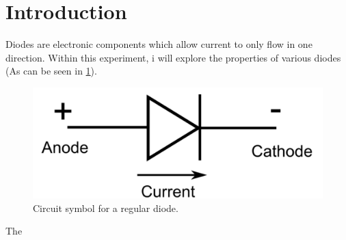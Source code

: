 \documentclass[12pt]{article}
\begin{document}

\newpage
\begin{titlepage}
\begin{tableofcontents}

\end{tableofcontents}
\end{titlepage}


\section{Introduction}

Diodes are electronic components which allow current to only flow in one direction. Within this experiment, i will explore the properties of various diodes (As can be seen in \cref{SymbolRegDiode}). 

\begin{figure}[h]
\centering
\includegraphics[scale=0.4]{Circuit_symbol_for_a_regular_diode.png}
\caption{Circuit symbol for a regular diode.}
\label{SymbolRegDiode}
\end{figure}

The 

\end{document}
